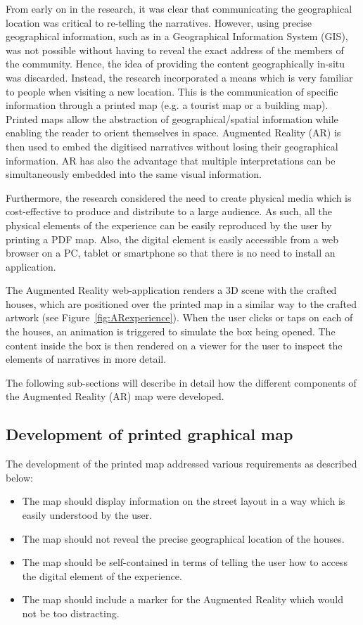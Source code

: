 \documentclass[acmlarge,screen,dvipsnames]{acmart}
\begin{document}
From early on in the research, it was clear that communicating the
geographical location was critical to re-telling the narratives. However,
using precise geographical information, such as in a Geographical Information
System (GIS), was not possible without having to reveal the exact address of the members of the community. Hence, the idea of providing the
content geographically in-situ was discarded. Instead, the research
incorporated a means which is very familiar to people when visiting a new
location. This is the communication of specific information through a printed
map (e.g. a tourist map or a building map). Printed maps allow the
abstraction of geographical/spatial information while enabling the reader to
orient themselves in space. Augmented Reality (AR) is then used to embed
the digitised narratives without losing their geographical information. AR has also the advantage that multiple interpretations can be simultaneously embedded into the same visual information. 

Furthermore, the research considered the need to create physical media which is
cost-effective to produce and distribute to a large audience. As such, all
the physical elements of the experience can be easily reproduced by the user by
printing a PDF map. Also, the digital element is easily accessible from a
web browser on a PC, tablet or smartphone so that there is no need to install an application. 

The Augmented Reality web-application renders a 3D scene with the crafted
houses, which are positioned over the printed map in a similar way to the
crafted artwork (see Figure~\ref{fig:ARexperience}). When the user clicks or
taps on each of the houses, an animation is triggered to simulate the box
being opened. The content inside the box is then rendered on a viewer for the
user to inspect the elements of narratives in more detail. 

The following sub-sections will describe in detail how the different
components of the Augmented Reality (AR) map were developed.

\subsection{Development of printed graphical map} %
The development of the printed map addressed various requirements as described
below:

\begin{itemize} 
  \item The map should display information on the street layout in a way which is easily understood by the user. 
  \item The map should not reveal the precise geographical location of the houses. 
  \item The map should be self-contained in terms of telling the user how to access 
  the digital element of the experience. 
  \item The map should include a marker for the Augmented Reality which would not be too distracting. 
\end{itemize}
\end{document}
